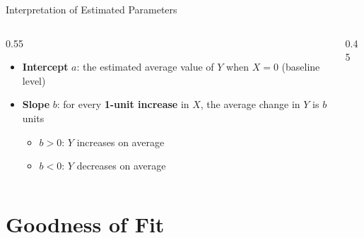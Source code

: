 \documentclass[12pt, aspectratio=169]{beamer}
\begin{document}
    \begin{frame}{Interpretation of Estimated Parameters}
        \begin{columns}
            \begin{column}{0.55\textwidth}
                \begin{itemize}
                    \item \textbf{Intercept} $a$: the estimated average value of $Y$ when $X = 0$ (baseline level)
                    \item \textbf{Slope} $b$: for every \textbf{1-unit increase} in $X$, the average change in $Y$ is $b$ units
                        \begin{itemize}
                            \item $b > 0$: $Y$ increases on average
                            \item $b < 0$: $Y$ decreases on average
                        \end{itemize}
                \end{itemize}
            \end{column}
            \begin{column}{0.45\textwidth}
                \begin{center}
                \end{center}
            \end{column}
        \end{columns}
    \end{frame}


    \section{Goodness of Fit}
\end{document}
